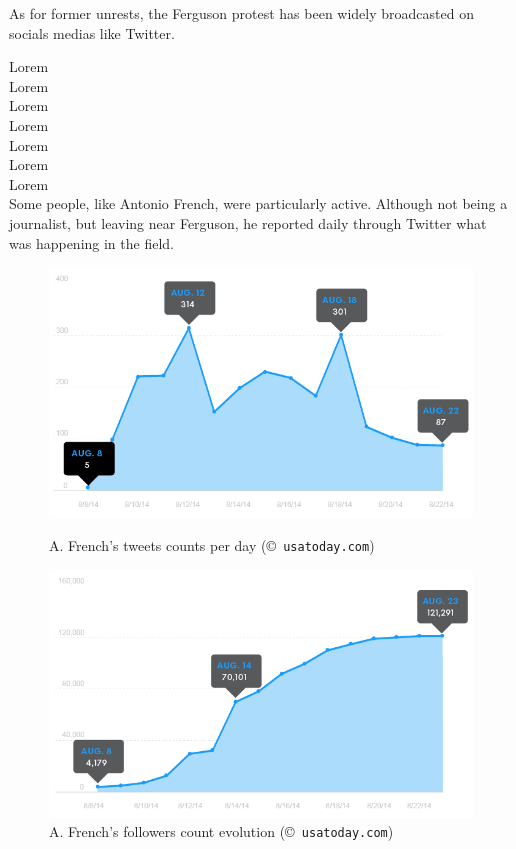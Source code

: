 \documentclass[a4paper,12pt]{report}
\begin{document}
As for former unrests, the Ferguson protest has been widely broadcasted on socials medias like Twitter. 

Lorem\\
Lorem\\
Lorem\\Lorem\\
Lorem\\
Lorem\\
Lorem\\

Some people, like Antonio French, were particularly active. Although not being a journalist, but leaving near Ferguson, he reported daily through Twitter what was happening in the field.

\begin{figure}[H]
\begin{minipage}[t]{0.48\textwidth}
\begin{center}
	\includegraphics[width=\textwidth]{images/freqs/intro/af_tweets.png}
	\caption{A. French's tweets counts per day (\copyright \texttt{ usatoday.com})}
	\label{af_tweets}
\end{center}
\end{minipage}
\hfill
\begin{minipage}[t]{0.48\textwidth}
\begin{center}
	\includegraphics[width=\textwidth]{images/freqs/intro/af_followers.png}
	\caption{A. French's followers count evolution (\copyright \texttt{ usatoday.com})}
	\label{af_followers}
\end{center}
\end{minipage}
\end{figure}
\end{document}
